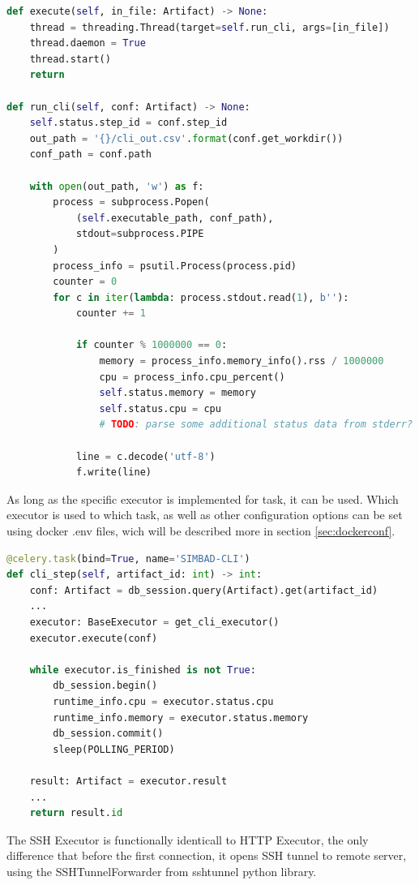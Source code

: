 \begin{lstlisting}[label=list:sp-exec-local,caption=Fragment of LocalExecutor for SimBaD-CLI, basicstyle=\footnotesize\ttfamily, language=python]
def execute(self, in_file: Artifact) -> None:
    thread = threading.Thread(target=self.run_cli, args=[in_file])
    thread.daemon = True
    thread.start()
    return
    
def run_cli(self, conf: Artifact) -> None:
    self.status.step_id = conf.step_id
    out_path = '{}/cli_out.csv'.format(conf.get_workdir())
    conf_path = conf.path

    with open(out_path, 'w') as f:
        process = subprocess.Popen(
            (self.executable_path, conf_path), 
            stdout=subprocess.PIPE
        )
        process_info = psutil.Process(process.pid)
        counter = 0
        for c in iter(lambda: process.stdout.read(1), b''):
            counter += 1

            if counter % 1000000 == 0:
                memory = process_info.memory_info().rss / 1000000
                cpu = process_info.cpu_percent()
                self.status.memory = memory
                self.status.cpu = cpu
                # TODO: parse some additional status data from stderr?

            line = c.decode('utf-8')
            f.write(line)
\end{lstlisting}
As long as the specific executor is implemented for task, it can be used. Which executor is used to which task, as well as other configuration options can be set using docker .env files, wich will be described more in section \ref{sec:dockerconf}.
\begin{lstlisting}[label=list:sp-exec-local-use,caption=Use of LocalExecutor for SimBaD-CLI step, basicstyle=\footnotesize\ttfamily, language=python]
@celery.task(bind=True, name='SIMBAD-CLI')
def cli_step(self, artifact_id: int) -> int:
    conf: Artifact = db_session.query(Artifact).get(artifact_id)
    ...
    executor: BaseExecutor = get_cli_executor()
    executor.execute(conf)

    while executor.is_finished is not True:
        db_session.begin()
        runtime_info.cpu = executor.status.cpu
        runtime_info.memory = executor.status.memory
        db_session.commit()
        sleep(POLLING_PERIOD)

    result: Artifact = executor.result
    ...
    return result.id
\end{lstlisting}
The SSH Executor is functionally identicall to HTTP Executor, the only difference that before the first connection, it opens SSH tunnel to remote server, using the SSHTunnelForwarder from sshtunnel python library. 

